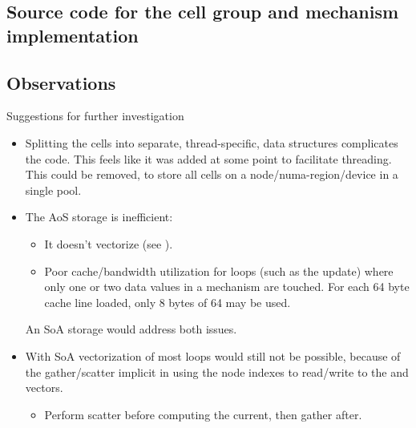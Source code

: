 \subsection{Source code for the cell group and mechanism implementation}
\label{sec:cellgroupccode}

\subsection{Observations}
\begin{infobox}{Suggestions for further investigation}
\begin{itemize}[leftmargin=*]
\item
    Splitting the cells into separate, thread-specific, data structures complicates the code. This feels like it was added at some point to facilitate threading. This could be removed, to store all cells on a node/numa-region/device in a single pool.
\item
    The AoS storage is inefficient:
    \begin{itemize}
    \item
        It doesn't vectorize (see ).
    \item
        Poor cache/bandwidth utilization for loops (such as the  update) where only one or two data values in a mechanism are touched. For each 64 byte cache line loaded, only 8 bytes of 64 may be used.
    \end{itemize}
    An SoA storage would address both issues.
\item
    With SoA vectorization of most loops would still not be possible, because of the gather/scatter implicit in using the node indexes to read/write to the  and  vectors.
    \begin{itemize}
    \item
        Perform scatter before computing the current, then gather after.
    \end{itemize}
\end{itemize}
\end{infobox}
